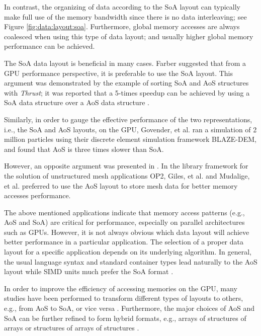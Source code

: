 In contrast, the organizing of data according to the SoA layout can 
typically make full use of the memory bandwidth since there is no data 
interleaving; see Figure \ref{fig:data:layout:soa}. Furthermore, global memory accesses are always coalesced when 
using this type of data layout; and usually higher global memory performance 
can be achieved. 

The SoA data layout is beneficial in many cases. Farber \cite{farber2011} suggested 
that from a GPU performance perspective, it is preferable to use the SoA 
layout. This argument was demonstrated by the example of sorting SoA and AoS 
structures with \textit{Thrust}; it was reported that a 5-times speedup can be 
achieved by using a SoA data structure over a AoS data structure \cite{bell2011}.

Similarly, in order to gauge the effective performance of the two 
representations, i.e., the SoA and AoS layouts, on the GPU, 
Govender, et al. \cite{govender2013} ran a simulation of 2 million particles 
using their discrete element simulation framework BLAZE-DEM, and found that 
AoS is three times slower than SoA.

However, an opposite argument was presented in \cite{giles2013}. In the library 
framework for the solution of unstructured mesh applications OP2, Giles, et al. \cite{giles2013} and Mudalige, et al. 
\cite{mudalige2013} preferred to use the AoS layout to store mesh data for better memory 
accesses performance. 

The above mentioned applications indicate that memory access patterns (e.g., AoS 
and SoA) are critical for performance, especially on parallel architectures 
such as GPUs. However, it is not always obvious which data layout will 
achieve better performance in a particular application. The selection of a proper data layout for a specific application depends on its underlying algorithm. In general, the 
usual language syntax and standard container types lead naturally to the AoS 
layout while SIMD units much prefer the SoA format \cite{strzodka2012}. 

In order to improve the efficiency of accessing memories on the GPU, many 
studies have been performed to transform different types of layouts to 
others, e.g., from AoS to SoA, or vice versa  \cite{mistry2011,strzodka2011,strzodka2012,sung2012}. Furthermore, the 
major choices of AoS and SoA can be further refined to form hybrid formats, 
e.g., arrays of structures of arrays \cite{abel1999} or structures of arrays of 
structures \cite{siegel2009}.


